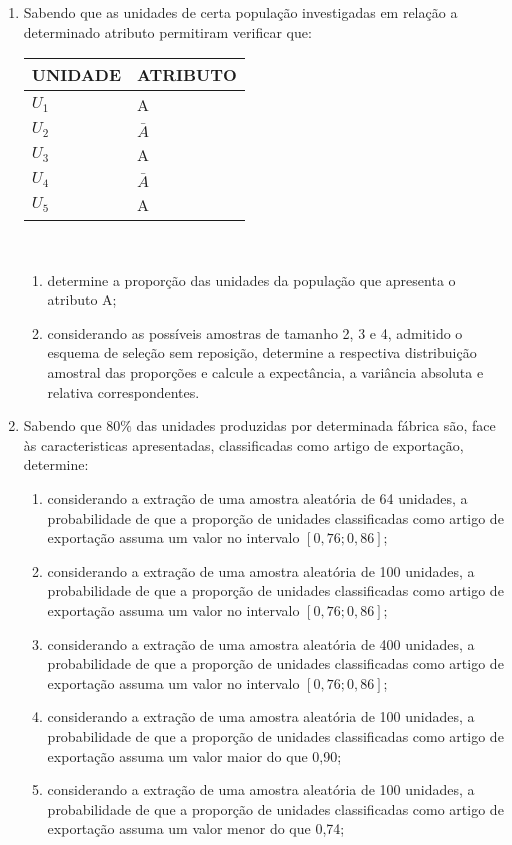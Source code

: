 \begin{enumerate}[resume]
\item Sabendo que as unidades de certa população investigadas em relação a determinado atributo permitiram verificar que:
	\begin{table}[!htb]
	\centering
	\vspace{0.5cm}
	\begin{tabular}{ll}
	UNIDADE & ATRIBUTO \\
	\hline 
	$U_{1}$ & A \\
	$U_{2}$ & $\bar{A}$ \\
	$U_{3}$ & A  \\
	$U_{4}$ & $\bar{A}$ \\
	$U_{5}$ & A \\
	\end{tabular}
	\end{table} \\	
	\begin{enumerate}
	\item determine a proporção das unidades da população que apresenta o atributo A;
	\item considerando as possíveis amostras de tamanho 2, 3 e 4, admitido o esquema de seleção sem reposição, determine a respectiva distribuição amostral das proporções e calcule a expectância, a variância absoluta e relativa correspondentes.
	\end{enumerate}	
	
\item Sabendo que $80\%$ das unidades produzidas por determinada fábrica são, face às caracteristicas apresentadas, classificadas como artigo de exportação, determine:
	\begin{enumerate}
	\item considerando a extração de uma amostra aleatória de 64 unidades, a probabilidade de que a proporção de unidades classificadas como artigo de exportação assuma um valor no intervalo $[0,76 ; 0,86]$;
	\item considerando a extração de uma amostra aleatória de 100 unidades, a probabilidade de que a proporção de unidades classificadas como artigo de exportação assuma um valor no intervalo $[0,76 ; 0,86]$;
	\item considerando a extração de uma amostra aleatória de 400 unidades, a probabilidade de que a proporção de unidades classificadas como artigo de exportação assuma um valor no intervalo $[0,76 ; 0,86]$;
	\item considerando a extração de uma amostra aleatória de 100 unidades, a probabilidade de que a proporção de unidades classificadas como artigo de exportação assuma um valor maior do que 0,90;
	\item considerando a extração de uma amostra aleatória de 100 unidades, a probabilidade de que a proporção de unidades classificadas como artigo de exportação assuma um valor menor do que 0,74;
	\end{enumerate}

\end{enumerate}